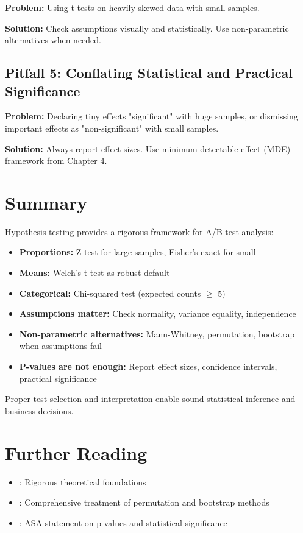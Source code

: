 \textbf{Problem:} Using t-tests on heavily skewed data with small samples.

\textbf{Solution:} Check assumptions visually and statistically. Use non-parametric alternatives when needed.

\subsection{Pitfall 5: Conflating Statistical and Practical Significance}

\textbf{Problem:} Declaring tiny effects "significant" with huge samples, or dismissing important effects as "non-significant" with small samples.

\textbf{Solution:} Always report effect sizes. Use minimum detectable effect (MDE) framework from Chapter 4.

\section{Summary}

Hypothesis testing provides a rigorous framework for A/B test analysis:

\begin{itemize}
    \item \textbf{Proportions:} Z-test for large samples, Fisher's exact for small
    \item \textbf{Means:} Welch's t-test as robust default
    \item \textbf{Categorical:} Chi-squared test (expected counts $\geq$ 5)
    \item \textbf{Assumptions matter:} Check normality, variance equality, independence
    \item \textbf{Non-parametric alternatives:} Mann-Whitney, permutation, bootstrap when assumptions fail
    \item \textbf{P-values are not enough:} Report effect sizes, confidence intervals, practical significance
\end{itemize}

Proper test selection and interpretation enable sound statistical inference and business decisions.

\section{Further Reading}

\begin{itemize}
    \item \cite{casella2002statistical}: Rigorous theoretical foundations
    \item \cite{good2013permutation}: Comprehensive treatment of permutation and bootstrap methods
    \item \cite{wasserstein2016asa}: ASA statement on p-values and statistical significance
\end{itemize}

